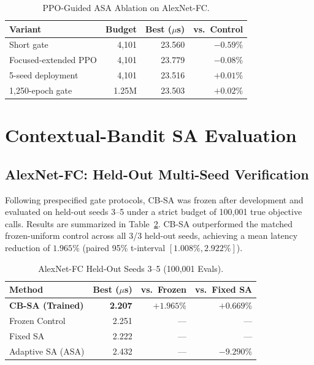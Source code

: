 \documentclass[10pt,conference]{IEEEtran}
\begin{document}
\begin{table}[t]
  \caption{PPO-Guided ASA Ablation on AlexNet-FC.}
  \label{tab:ppo-asa-results}
  \centering
  \footnotesize
  \setlength{\tabcolsep}{4pt}
  \begin{tabular}{lrrr}
    \toprule
    Variant & Budget & Best ($\mu$s) & vs.\ Control \\
    \midrule
    Short gate & 4,101 & 23.560 & $-0.59\%$ \\
    Focused-extended PPO & 4,101 & 23.779 & $-0.08\%$ \\
    5-seed deployment & 4,101 & 23.516 & $+0.01\%$ \\
    1,250-epoch gate & 1.25M & 23.503 & $+0.02\%$ \\
    \bottomrule
  \end{tabular}
\end{table}

\section{Contextual-Bandit SA Evaluation}
\label{sec:evaluation}

\subsection{AlexNet-FC: Held-Out Multi-Seed Verification}
Following prespecified gate protocols, CB-SA was frozen after development and evaluated on held-out seeds 3--5 under a strict budget of 100,001 true objective calls. Results are summarized in Table~\ref{tab:alexnet-fc-holdout}. CB-SA outperformed the matched frozen-uniform control across all 3/3 held-out seeds, achieving a mean latency reduction of $\mathbf{1.965\%}$ (paired 95\% t-interval $[1.008\%, 2.922\%]$).

\begin{table}[t]
  \caption{AlexNet-FC Held-Out Seeds 3--5 (100,001 Evals).}
  \label{tab:alexnet-fc-holdout}
  \centering
  \footnotesize
  \setlength{\tabcolsep}{3.5pt}
  \begin{tabular}{lrrr}
    \toprule
    Method & Best ($\mu$s) & vs.\ Frozen & vs.\ Fixed SA \\
    \midrule
    \textbf{CB-SA (Trained)} & \textbf{2.207} & $\mathbf{+1.965\%}$ & $\mathbf{+0.669\%}$ \\
    Frozen Control & 2.251 & --- & --- \\
    Fixed SA & 2.222 & --- & --- \\
    Adaptive SA (ASA) & 2.432 & --- & $-9.290\%$ \\
    \bottomrule
  \end{tabular}
\end{table}
\end{document}
